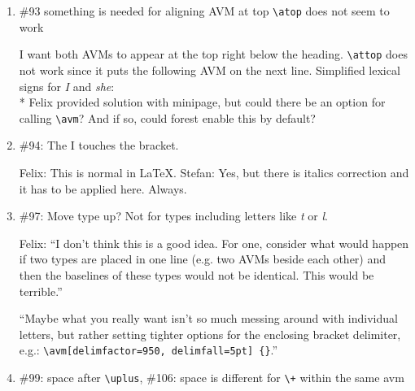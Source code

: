 \documentclass[output=book
		,modfonts
		,nonflat
	        ,collection
	        ,collectionchapter
	        ,collectiontoclongg
 	        ,biblatex  
                ,babelshorthands
                ,newtxmath
                ,colorlinks, citecolor=brown 
                ,draftmode
		  ]{langscibook}
\begin{document}
\begin{enumerate}
\item \#93 something is needed for aligning AVM at top \verb+\atop+ does not seem to work


I want both AVMs to appear at the top right below the heading. \verb+\attop+ does not work since it puts the following AVM on the next line.
\ea
\label{entryfori}
Simplified lexical signs for  \textit{I} and \textit{she}: \\*
\hspace{1cm}
\z
Felix provided solution with minipage, but could there be an option for calling \verb+\avm+? And if
so, could forest enable this by default?


\item \#94: The I touches the bracket.

\ea
{}
\z

Felix: This is normal in \LaTeX. Stefan: Yes, but there is italics correction and it has to be
applied here. Always.


\item \#97: Move type up? Not for types including letters like \emph{t} or \emph{l}.

\ea
{}
\z

Felix: ``I don't think this is a good idea. For one, consider what would happen if two types are
placed in one line (e.g. two AVMs beside each other) and then the baselines of these types would not
be identical. This would be terrible.''

``Maybe what you really want isn't so much messing around with individual letters, but rather setting tighter options for the enclosing bracket delimiter, e.g.: \verb+\avm[delimfactor=950, delimfall=5pt] {}+.''


\item \#99: space after \verb+\uplus+, \#106: space is different for \verb-\+- within the same avm


\ea
{}
\z


\end{enumerate}
\end{document}
